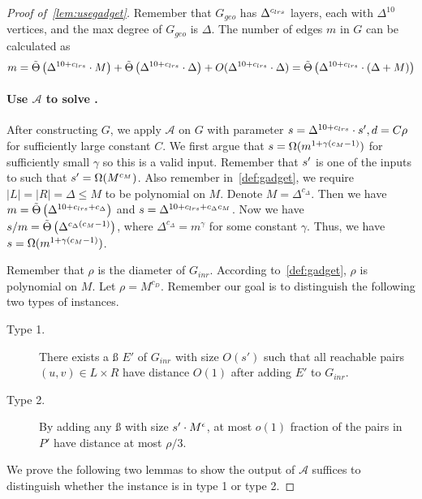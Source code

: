 \begin{proof}[Proof of~\cref{lem:usegadget}]
	Remember that $G_{geo}$ has $\Delta^{{c_{lrs}}{}}$ layers, each with $\Delta^{10}$ vertices, and the max degree of $G_{geo}$ is $\Delta$. The number of edges $m$ in $G$ can be calculated as
	\[m=\tilde{\Theta}\left(\Delta^{10+{c_{lrs}}{}}\cdot M\right)+\tilde{\Theta}\left(\Delta^{10+{c_{lrs}}{}}\cdot \Delta\right)+O(\Delta^{10+{c_{lrs}}{}}\cdot \Delta)=\tilde{\Theta}\left(\Delta^{10+{c_{lrs}}{}}\cdot(\Delta+M)\right)\]
	
	\paragraph{Use $\mathcal{A}$ to solve \gadget{\cs{}}{\epsilon}.} After constructing $G$, we apply $\mathcal{A}$ on $G$ with parameter $s=\Delta^{10+{c_{lrs}}}\cdot {s'}, d=C\rho$ for sufficiently large constant $C$. We first argue that $s=\Omega(m^{1+\gamma(c_M{}-1)})$ for sufficiently small $\gamma$ so this is a valid input. Remember that ${s'}$ is one of the inputs to \gadget{\cs{}}{\epsilon} such that $s'=\Omega(M^{c_M{}})$. Also remember in~\cref{def:gadget}, we require $|L|=|R|=\Delta\le M$ to be polynomial on $M$. Denote $M=\Delta^{c_{\Delta}}$. Then we have $m=\tilde{\Theta}\left(\Delta^{10+{c_{lrs}}{}+c_\Delta}\right)$ and $s=\Delta^{10+{c_{lrs}}{}+c_{\Delta}c_M{}}$. Now we have $s/m=\tilde{\Theta}\left(\Delta^{c_\Delta(c_M{}-1)}\right)$, where $\Delta^{c_\Delta}=m^{\gamma}$ for some constant $\gamma$. Thus, we have $s=\Omega(m^{1+\gamma(c_M{}-1)})$.
	
Remember that $\rho$ is the diameter of $G_{inr}$. According to~\cref{def:gadget}, $\rho{}$ is polynomial on $M$. Let $\rho{}= M^{c_D}$. %
Remember our goal is to distinguish the following two types of \gadget{\cs{}}{\epsilon} instances.

\begin{description}
	\item[Type 1.] There exists a \ss{} $E'$ of $G_{inr}$ with size $O(s')$ such that all reachable pairs $(u,v)\in L\times R$ have distance $O(1)$ after adding $E'$ to $G_{inr}$.
	\item[Type 2.] By adding any \ss{} with size ${s'}\cdot M^{\epsilon}$, at most $o(1)$ fraction of the pairs in $P'$ have distance at most $\rho{}/3$.
\end{description}

We prove the following two lemmas to show the output of $\mathcal{A}$ suffices to distinguish whether the \gadget{\cs{}}{\epsilon} instance is in type 1 or type 2. %


\end{proof}
